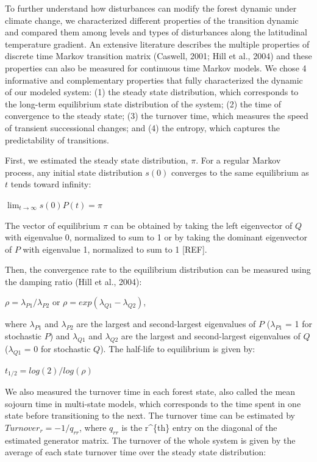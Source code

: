 \documentclass[a4paperpaper,]{article}
\begin{document}
To further understand how disturbances can modify the forest dynamic
under climate change, we characterized different properties of the
transition dynamic and compared them among levels and types of
disturbances along the latitudinal temperature gradient. An extensive
literature describes the multiple properties of discrete time Markov
transition matrix (Caswell, 2001; Hill et al., 2004) and these
properties can also be measured for continuous time Markov models. We
chose 4 informative and complementary properties that fully
characterized the dynamic of our modeled system: (1) the steady state
distribution, which corresponds to the long-term equilibrium state
distribution of the system; (2) the time of convergence to the steady
state; (3) the turnover time, which measures the speed of transient
successional changes; and (4) the entropy, which captures the
predictability of transitions.

First, we estimated the steady state distribution, \(\pi\). For a
regular Markov process, any initial state distribution \(s(0)\)
converges to the same equilibrium as \(t\) tends toward infinity:

\(\displaystyle \lim_{t \to \infty} s(0)P(t)=\pi\)

The vector of equilibrium \(\pi\) can be obtained by taking the left
eigenvector of \(Q\) with eigenvalue 0, normalized to sum to 1 or by
taking the dominant eigenvector of \(P\) with eigenvalue 1, normalized
to sum to 1 {[}REF{]}.

Then, the convergence rate to the equilibrium distribution can be
measured using the damping ratio (Hill et al., 2004):

\(\rho = \lambda_{P1} / \lambda_{P2}\) or
\(\rho = exp(\lambda_{Q1} - \lambda_{Q2})\),

where \(\lambda_{P1}\) and \(\lambda_{P2}\) are the largest and
second-largest eigenvalues of \(P\) (\(\lambda_{P1}\) = 1 for stochastic
\(P\)) and \(\lambda_{Q1}\) and \(\lambda_{Q2}\) are the largest and
second-largest eigenvalues of \(Q\) (\(\lambda_{Q1}\) = 0 for stochastic
\(Q\)). The half-life to equilibrium is given by:

\(t_{1/2} = log(2)/log(\rho)\)

We also measured the turnover time in each forest state, also called the
mean sojourn time in multi-state models, which corresponds to the time
spent in one state before transitioning to the next. The turnover time
can be estimated by \(Turnover_{r} =−1/q_{rr}\), where \(q_{rr}\) is the
r\^{}\{th\} entry on the diagonal of the estimated generator matrix. The
turnover of the whole system is given by the average of each state
turnover time over the steady state distribution:
\end{document}
